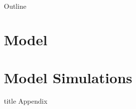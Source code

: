 \documentclass[compress, 8pt]{beamer}
\begin{document}
\miniframesoff
\begin{frame}{Outline}
    \tableofcontents
\end{frame}
\miniframeson

\section[Model]{Model}



\miniframesoff
\section[Simulations]{Model Simulations}
\begin{frame}
    \tableofcontents[currentsection]
\end{frame}
\miniframeson





\miniframesoff
\begin{frame}[noframenumbering]
\begin{beamercolorbox}[sep=11pt,center]{title}
Appendix
\end{beamercolorbox}
\end{frame}


\end{document}
